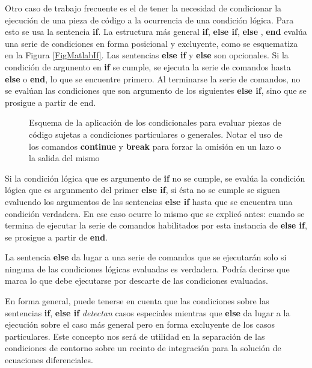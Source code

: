 
Otro caso de trabajo frecuente es el de tener 
la necesidad de condicionar la ejecución de 
una pieza de código a la ocurrencia de una 
condición lógica. Para esto se usa la sentencia
\textbf{if}. La estructura más general \textbf{if},
\textbf{else if}, \textbf{else} , \textbf{end} evalúa
una serie de condiciones en forma posicional  y 
excluyente, como se esquematiza en la Figura 
\autoref{FigMatlabIf}. Las sentencias \textbf{else if} y 
\textbf{else} son opcionales. Si la condición 
de argunento en \textbf{if} se cumple, se ejecuta
la serie de comandos hasta \textbf{else} o 
\textbf{end}, lo que se encuentre primero. Al 
terminarse la serie de comandos, no se evalúan 
las condiciones que son argumento de los 
siguientes \textbf{else if}, sino que se
prosigue a partir de end. 

\begin{figure}
  
  \caption{Esquema de la aplicación de los condicionales   para 
  evaluar piezas de código sujetas a condiciones 
  particulares o generales. Notar el uso de los comandos 
  \protect\textbf{continue} y \protect\textbf{break} para forzar la 
  omisión en un lazo o la salida del mismo
  \label{FigMatlabIf}
  }

\end{figure}

Si la condición lógica que es argumento de \textbf{if}
no se cumple, se evalúa 
la condición lógica que es argunmento del 
primer \textbf{else if}, si ésta no se cumple 
se siguen evaluendo los argumentos de las
sentencias \textbf{else if} hasta que se encuentra 
una condición verdadera. En ese caso ocurre lo 
mismo que se explicó antes: cuando se termina
de ejecutar la serie de comandos habilitados
por esta instancia de \textbf{else if}, se
prosigue a partir de \textbf{end}.

La sentencia \textbf{else} da lugar a una serie de
comandos que se ejecutarán solo si ninguna de las 
condiciones lógicas evaluadas es verdadera. 
Podría decirse que marca lo que debe ejecutarse por 
descarte de las condiciones evaluadas. 

En forma general, puede tenerse en cuenta que las 
condiciones sobre las sentencias \textbf{if}, 
\textbf{else if} \emph{ detectan} casos especiales
mientras que \textbf{else} da lugar a la ejecución
sobre el caso más general pero en forma 
excluyente de los casos particulares. Este 
concepto nos será de utilidad en la separación
de las condiciones de contorno sobre un 
recinto de integración para la solución
de ecuaciones diferenciales. 

\mode*
